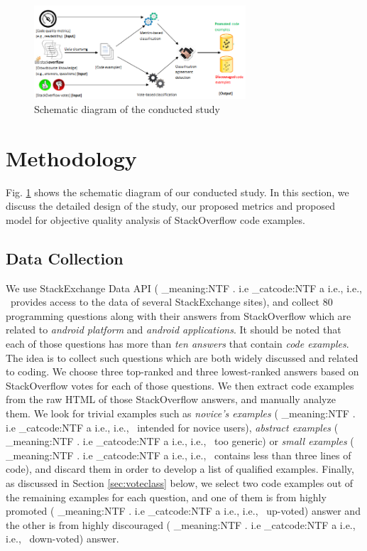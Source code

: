 \documentclass[conference]{IEEEtran}
\makeatletter
\newcommand\latinabbrev[1]{
  \peek_meaning:NTF . {%
    #1\@}%
  { \peek_catcode:NTF a {%
      #1., \@ }%
    {#1., \@}}}
\def\ie{\latinabbrev{i.e}}
\makeatother
\begin{document}
\begin{figure}[!t]
\centering
\includegraphics[width=3.1in]{sysdiag}
\caption{Schematic diagram of the conducted study}
\vspace{-.2cm}
\label{fig:sysdiag}
\end{figure}
\vspace{-.2cm}
\section{Methodology}
\label{sec:theory}
Fig. \ref{fig:sysdiag} shows the schematic diagram of our conducted study.
In this section, we discuss the detailed design of the study, our proposed metrics and proposed model for objective quality analysis of StackOverflow code examples.
\subsection{Data Collection}
We use StackExchange Data API \cite{api} (\ie\ provides access to the data of several StackExchange sites), and collect 80 programming questions along with their answers from StackOverflow which are related to \emph{android platform} and \emph{android applications}.
It should be noted that each of those questions has more than \emph{ten answers} that contain \emph{code examples}. The idea is to collect such questions which are both widely discussed and related to coding. 
We choose three top-ranked and three lowest-ranked answers based on StackOverflow votes for each of those questions. We then extract code examples from the raw HTML of those StackOverflow answers, and manually analyze them.
We look for trivial examples such as \emph{novice's examples} (\ie\ intended for novice users), \emph{abstract examples} (\ie\ too generic) or \emph{small examples} (\ie\ contains less than three lines of code), and discard them in order to develop a list of qualified examples. 
Finally, as discussed in Section \ref{sec:voteclass} below, we select two code examples out of the remaining examples for each question, and one of them is from highly promoted (\ie\ up-voted) answer and the other is from highly discouraged (\ie\ down-voted) answer.
\end{document}
